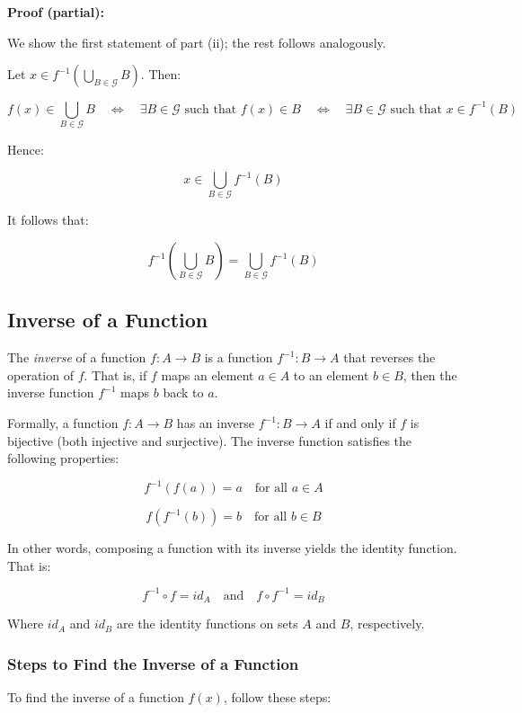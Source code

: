 \textbf{Proof (partial):}

We show the first statement of part (ii); the rest follows analogously.

Let \( x \in f^{-1} \left( \bigcup_{B \in \mathcal{G}} B \right) \). Then:

\[
	f(x) \in \bigcup_{B \in \mathcal{G}} B
	\quad \Leftrightarrow \quad
	\exists B \in \mathcal{G} \text{ such that } f(x) \in B
	\quad \Leftrightarrow \quad
	\exists B \in \mathcal{G} \text{ such that } x \in f^{-1}(B)
\]

Hence:

\[
	x \in \bigcup_{B \in \mathcal{G}} f^{-1}(B)
\]

It follows that:

\[
	f^{-1} \left( \bigcup_{B \in \mathcal{G}} B \right) = \bigcup_{B \in \mathcal{G}} f^{-1}(B)
\]

\QED

\subsection{Inverse of a Function}

The \emph{inverse} of a function \(f: A \to B\) is a function \(f^{-1}: B \to A\) that 
reverses the operation of \(f\). That is, if \(f\) maps an element \(a \in A\) to an 
element \(b \in B\), then the inverse function \(f^{-1}\) maps \(b\) back to \(a\).

Formally, a function \(f: A \to B\) has an inverse \(f^{-1}: B \to A\)  
if and only if \(f\) is bijective (both injective and surjective). The inverse function satisfies the 
following properties:

\[
	f^{-1}(f(a)) = a \quad \text{for all } a \in A
\]

\[
	f(f^{-1}(b)) = b \quad \text{for all } b \in B
\]

In other words, composing a function with its inverse yields the identity function. That is:

\[
	f^{-1} \circ f = id_A \quad \text{and} \quad f \circ f^{-1} = id_B
\]

Where \(id_A\) and \(id_B\) are the identity functions on sets \(A\) and \(B\), respectively.

\subsubsection{Steps to Find the Inverse of a Function}

To find the inverse of a function \(f (x)\), follow these steps:

